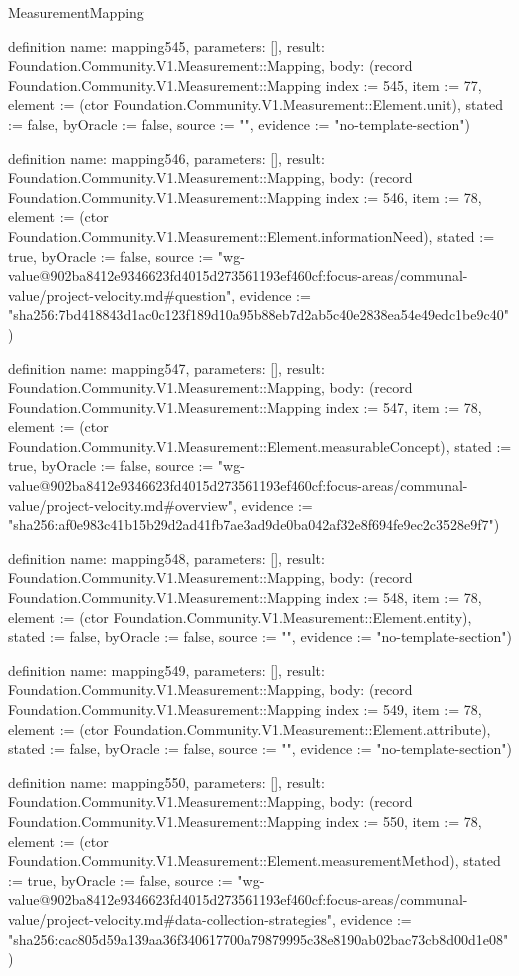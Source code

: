 \begin{lexlean}{MeasurementMapping}
\begin{semanticmodule}
definition{
  name: mapping545,
  parameters: [],
  result: Foundation.Community.V1.Measurement::Mapping,
  body: (record Foundation.Community.V1.Measurement::Mapping {index := 545, item := 77, element := (ctor Foundation.Community.V1.Measurement::Element.unit), stated := false, byOracle := false, source := "", evidence := "no-template-section"})
}

definition{
  name: mapping546,
  parameters: [],
  result: Foundation.Community.V1.Measurement::Mapping,
  body: (record Foundation.Community.V1.Measurement::Mapping {index := 546, item := 78, element := (ctor Foundation.Community.V1.Measurement::Element.informationNeed), stated := true, byOracle := false, source := "wg-value@902ba8412e9346623fd4015d273561193ef460cf:focus-areas/communal-value/project-velocity.md#question", evidence := "sha256:7bd418843d1ac0c123f189d10a95b88eb7d2ab5c40e2838ea54e49edc1be9c40"})
}

definition{
  name: mapping547,
  parameters: [],
  result: Foundation.Community.V1.Measurement::Mapping,
  body: (record Foundation.Community.V1.Measurement::Mapping {index := 547, item := 78, element := (ctor Foundation.Community.V1.Measurement::Element.measurableConcept), stated := true, byOracle := false, source := "wg-value@902ba8412e9346623fd4015d273561193ef460cf:focus-areas/communal-value/project-velocity.md#overview", evidence := "sha256:af0e983c41b15b29d2ad41fb7ae3ad9de0ba042af32e8f694fe9ec2c3528e9f7"})
}

definition{
  name: mapping548,
  parameters: [],
  result: Foundation.Community.V1.Measurement::Mapping,
  body: (record Foundation.Community.V1.Measurement::Mapping {index := 548, item := 78, element := (ctor Foundation.Community.V1.Measurement::Element.entity), stated := false, byOracle := false, source := "", evidence := "no-template-section"})
}

definition{
  name: mapping549,
  parameters: [],
  result: Foundation.Community.V1.Measurement::Mapping,
  body: (record Foundation.Community.V1.Measurement::Mapping {index := 549, item := 78, element := (ctor Foundation.Community.V1.Measurement::Element.attribute), stated := false, byOracle := false, source := "", evidence := "no-template-section"})
}

definition{
  name: mapping550,
  parameters: [],
  result: Foundation.Community.V1.Measurement::Mapping,
  body: (record Foundation.Community.V1.Measurement::Mapping {index := 550, item := 78, element := (ctor Foundation.Community.V1.Measurement::Element.measurementMethod), stated := true, byOracle := false, source := "wg-value@902ba8412e9346623fd4015d273561193ef460cf:focus-areas/communal-value/project-velocity.md#data-collection-strategies", evidence := "sha256:cac805d59a139aa36f340617700a79879995c38e8190ab02bac73cb8d00d1e08"})
}


\end{semanticmodule}
\end{lexlean}
